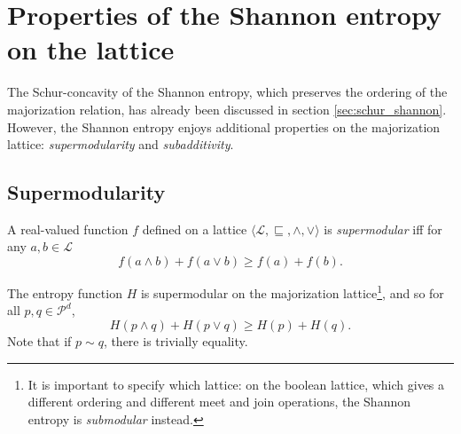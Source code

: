 \section{Properties of the Shannon entropy on the lattice}

The Schur-concavity of the Shannon entropy, which preserves the ordering of the majorization relation, has already been discussed in section \ref{sec:schur_shannon}. However, the Shannon entropy enjoys additional properties on the majorization lattice: \textit{supermodularity} and \textit{subadditivity}.



\subsection{Supermodularity} \label{sec:supermodularity}

\begin{definition}
    A real-valued function $f$ defined on a lattice $\langle \mathcal{L}, \sqsubseteq, \wedge, \vee \rangle$ is \textit{supermodular} iff for any $a, b \in \mathcal{L}$
    \begin{equation}
        f(a \wedge b) + f(a \vee b) \geq f(a) + f(b).
    \end{equation}
\end{definition}

\begin{theorem}
    The entropy function $H$ is supermodular on the majorization lattice\footnote{It is important to specify which lattice: on the boolean lattice, which gives a different ordering and different meet and join operations, the Shannon entropy is \textit{submodular} instead.}, and so for all $p, q \in \mathcal{P}^d$,
    \begin{equation} \label{eq:supermodularity}
        H(p \wedge q) + H(p \vee q) \geq H(p) + H(q).
    \end{equation}
    Note that if $p \sim q$, there is trivially equality.
\end{theorem}

